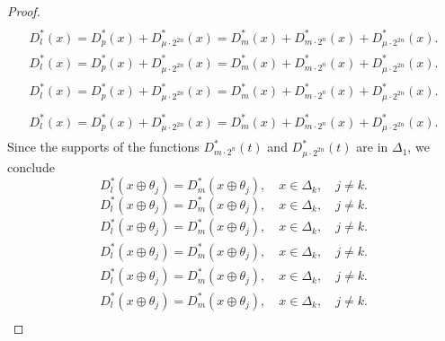 \documentclass{amsart}
\numberwithin{equation}{section}
\begin{document}
\begin{proof}
{\begin{gather}
\end{gather}\fi   
{}\begin{multline*}
D_l^*(x)=D_p^*(x)+D_{\mu\cdot 2^{2n}}^*(x)=D_{m}^*(x)+D_{m\cdot 2^n}^*(x)+D_{\mu\cdot 2^{2n}}^*(x).
\end{multline*}\fi  
{}\begin{multline}
D_l^*(x)=D_p^*(x)+D_{\mu\cdot 2^{2n}}^*(x)=D_{m}^*(x)+D_{m\cdot 2^n}^*(x)+D_{\mu\cdot 2^{2n}}^*(x).
\end{multline}\fi  
{}\begin{multline*}\begin{split}
D_l^*(x)=D_p^*(x)+D_{\mu\cdot 2^{2n}}^*(x)=D_{m}^*(x)+D_{m\cdot 2^n}^*(x)+D_{\mu\cdot 2^{2n}}^*(x).
\end{split}\end{multline*}\fi
{}\begin{multline}\begin{split}
D_l^*(x)=D_p^*(x)+D_{\mu\cdot 2^{2n}}^*(x)=D_{m}^*(x)+D_{m\cdot 2^n}^*(x)+D_{\mu\cdot 2^{2n}}^*(x).
\end{split}\end{multline}\fi
}
Since the supports of the functions $D_{m\cdot 2^n}^*(t)$ and $D_{\mu\cdot 2^{2n}}^*(t)$ are in $\Delta_1$, we conclude
{
\begin{equation*} \label{a24}
D_l^*(x\oplus\theta_j)=D_m^*(x\oplus\theta_j),\quad x\in \Delta_k, \quad j\neq  k.
 \end{equation*}\fi  
{}\begin{equation}\label{a24}
D_l^*(x\oplus\theta_j)=D_m^*(x\oplus\theta_j),\quad x\in \Delta_k, \quad j\neq  k.
\end{equation}\fi   
{}\begin{align*}\label{a24}
D_l^*(x\oplus\theta_j)=D_m^*(x\oplus\theta_j),\quad x\in \Delta_k, \quad j\neq  k.
\end{align*}\fi   
{}\begin{align}\label{a24}
D_l^*(x\oplus\theta_j)=D_m^*(x\oplus\theta_j),\quad x\in \Delta_k, \quad j\neq  k.
\end{align}\fi    
{}\begin{gather*}\label{a24}
D_l^*(x\oplus\theta_j)=D_m^*(x\oplus\theta_j),\quad x\in \Delta_k, \quad j\neq  k.
\end{gather*}\fi  
{}\begin{gather}\label{a24}
D_l^*(x\oplus\theta_j)=D_m^*(x\oplus\theta_j),\quad x\in \Delta_k, \quad j\neq  k.
\end{gather}\fi   
{}\begin{multline*}\label{a24}

\end{multline*}}
\end{proof}
\end{document}
